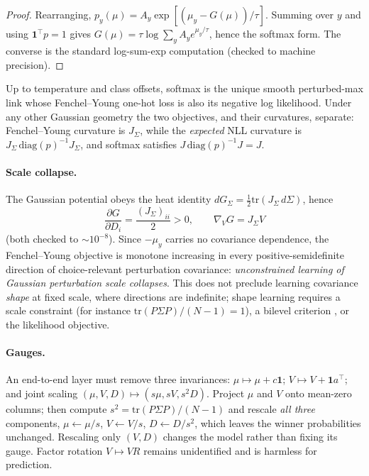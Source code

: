 \documentclass[11pt]{article}
\theoremstyle{remark}
\begin{document}
\begin{proof}
Rearranging, $p_y(\mu) = A_y \exp[(\mu_y - G(\mu))/\tau]$. Summing
over $y$ and using $\mathbf{1}^\top p = 1$ gives $G(\mu) = \tau \log
\sum_y A_y e^{\mu_y / \tau}$, hence the softmax form. The converse is
the standard log-sum-exp computation (checked to machine precision).
\end{proof}

Up to temperature and class offsets, softmax is the unique smooth
perturbed-max link whose Fenchel--Young one-hot loss is also its
negative log likelihood. Under any other Gaussian geometry the two
objectives, and their curvatures, separate: Fenchel--Young curvature is
$J_\Sigma$, while the \emph{expected} NLL curvature is
$J_\Sigma\,\mathrm{diag}(p)^{-1} J_\Sigma$, and softmax satisfies
$J\,\mathrm{diag}(p)^{-1} J = J$.

\paragraph{Scale collapse.} The Gaussian potential obeys the heat
identity $d G_\Sigma = \tfrac12 \mathrm{tr}(J_\Sigma\, d\Sigma)$, hence
\[
\frac{\partial G}{\partial D_i} = \frac{(J_\Sigma)_{ii}}{2} > 0, \qquad
\nabla_V G = J_\Sigma V
\]
(both checked to $\sim10^{-8}$). Since $-\mu_y$ carries no covariance
dependence, the Fenchel--Young objective is monotone increasing in
every positive-semidefinite direction of choice-relevant perturbation
covariance: \emph{unconstrained learning of Gaussian perturbation
scale collapses}. This does not preclude learning covariance
\emph{shape} at fixed scale, where directions are indefinite; shape
learning requires a scale constraint (for instance $\mathrm{tr}(P
\Sigma P)/(N-1) = 1$), a bilevel criterion \citep{lin2026}, or the
likelihood objective.

\paragraph{Gauges.} An end-to-end layer must remove three invariances:
$\mu \mapsto \mu + c\mathbf{1}$; $V \mapsto V + \mathbf{1}a^\top$; and
joint scaling $(\mu, V, D) \mapsto (s\mu, sV, s^2 D)$. Project $\mu$
and $V$ onto mean-zero columns; then compute $s^2 = \mathrm{tr}(P
\Sigma P)/(N-1)$ and rescale \emph{all three} components, $\mu
\leftarrow \mu/s$, $V \leftarrow V/s$, $D \leftarrow D/s^2$, which
leaves the winner probabilities unchanged. Rescaling only $(V, D)$
changes the model rather than fixing its gauge. Factor rotation $V
\mapsto VR$ remains unidentified and is harmless for prediction.
\end{document}
